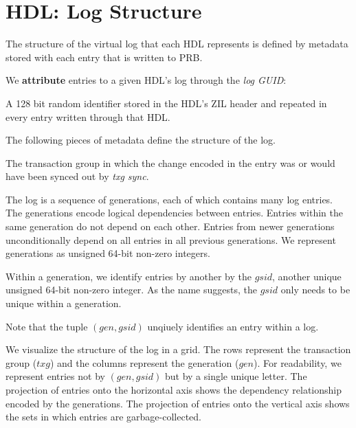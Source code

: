 \documentclass[12pt,a4paper,twoside]{book}
\begin{document}
\section{HDL: Log Structure}\label{di:prb:logstructure}
The structure of the virtual log that each HDL represents is defined by metadata stored with each entry that is written to PRB.

We \textbf{attribute} entries to a given HDL's log through the \textit{log GUID}:
\begin{description}[noitemsep,leftmargin=1.5cm,labelindent=1cm]
    \item[Log GUID] A 128 bit random identifier stored in the HDL's ZIL header and repeated in every entry written through that HDL.
\end{description}

The following pieces of metadata define the structure of the log.
\begin{description}[noitemsep,leftmargin=1.5cm,labelindent=1cm]
    \item[Transaction Group (txg)] The transaction group in which the change encoded in the entry was or would have been synced out by \textit{txg sync}.
    \item[Generation Number (gen)] The log is a sequence of generations, each of which contains many log entries.
        The generations encode logical dependencies between entries.
        Entries within the same generation do not depend on each other.
        Entries from newer generations unconditionally depend on all entries in all previous generations.
        We represent generations as unsigned 64-bit non-zero integers.
    \item[Generation-Scoped ID (gsid)] Within a generation, we identify entries by another by the $gsid$, another unique unsigned 64-bit non-zero integer.
        As the name suggests, the $gsid$ only needs to be unique within a generation.
\end{description}
Note that the tuple $(gen, gsid)$ unqiuely identifies an entry within a log.

We visualize the structure of the log in a grid.
The rows represent the transaction group ($txg$) and the columns represent the generation ($gen$).
For readability, we represent entries not by $(gen, gsid)$ but by a single unique letter.
The projection of entries onto the horizontal axis shows the dependency relationship encoded by the generations.
The projection of entries onto the vertical axis shows the sets in which entries are garbage-collected.
\end{document}
